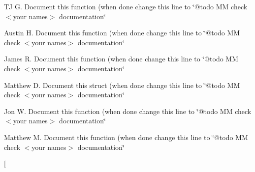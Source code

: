 \begin{DoxyRefList}
\item[\label{todo__todo000024}%
\hypertarget{todo__todo000024}{}%
global\+Scope$>$ Global \hyperlink{group__list_ga4642790508a72a9e6af89eb654417154}{List\+\_\+\+Get\+Next} (\hyperlink{structlist__t}{list\+\_\+t} $\ast$list, void $\ast$item)]T\+J G. Document this function (when done change this line to \char`\"{}@todo M\+M check $<$your names$>$ documentation\char`\"{}  
\item[\label{todo__todo000013}%
\hypertarget{todo__todo000013}{}%
global\+Scope$>$ Global \hyperlink{group__list_gacc707ed1f1ffdb563d26a5197786fbcb}{List\+\_\+\+Init} (\hyperlink{structlist__t}{list\+\_\+t} $\ast$list, uint16\+\_\+t item\+\_\+size, void $\ast$item\+\_\+array, uint16\+\_\+t item\+\_\+array\+\_\+length, \hyperlink{structlist__link__t}{list\+\_\+link\+\_\+t} $\ast$link\+\_\+array)]Austin H. Document this function (when done change this line to \char`\"{}@todo M\+M check $<$your names$>$ documentation\char`\"{}  
\item[\label{todo__todo000018}%
\hypertarget{todo__todo000018}{}%
global\+Scope$>$ Global \hyperlink{group__list_ga645d81a49b82c4009487089fd4f98338}{List\+\_\+\+Link} (\hyperlink{structlist__t}{list\+\_\+t} $\ast$list)]James R. Document this function (when done change this line to \char`\"{}@todo M\+M check $<$your names$>$ documentation\char`\"{}  
\item[\label{todo__todo000011}%
\hypertarget{todo__todo000011}{}%
global\+Scope$>$ Global \hyperlink{group__list_ga072d443e962ee5e68a26011a5089325c}{list\+\_\+link\+\_\+t} ]Matthew D. Document this struct (when done change this line to \char`\"{}@todo M\+M check $<$your names$>$ documentation\char`\"{}  
\item[\label{todo__todo000021}%
\hypertarget{todo__todo000021}{}%
global\+Scope$>$ Global \hyperlink{group__list_gab6f45e11004da187e5637ab46831d39b}{List\+\_\+\+Link\+Item} (\hyperlink{structlist__t}{list\+\_\+t} $\ast$list, void $\ast$item)]Jon W. Document this function (when done change this line to \char`\"{}@todo M\+M check $<$your names$>$ documentation\char`\"{}  
\item[\label{todo__todo000028}%
\hypertarget{todo__todo000028}{}%
global\+Scope$>$ Global \hyperlink{group__list_ga80fa129ff1dfe7cc85d164d5a6fccf42}{List\+\_\+\+Remove} (\hyperlink{structlist__t}{list\+\_\+t} $\ast$list, void $\ast$item)]Matthew M. Document this function (when done change this line to \char`\"{}@todo M\+M check $<$your names$>$ documentation\char`\"{}  
\item[\label{todo__todo000029}%

\end{DoxyRefList}
